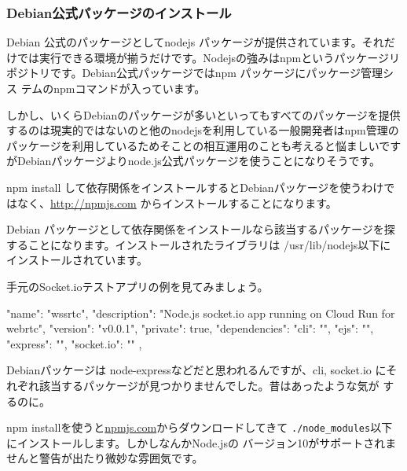 \documentclass[mingoth,a4paper]{jsarticle}
\begin{document}
\subsubsection{Debian公式パッケージのインストール}


Debian 公式のパッケージとしてnodejs パッケージが提供されています。それだ
けでは実行できる環境が揃うだけです。Nodejsの強みはnpmというパッケージリ
ポジトリです。Debian公式パッケージではnpm パッケージにパッケージ管理シス
テムのnpmコマンドが入っています。


しかし、いくらDebianのパッケージが多いといってもすべてのパッケージを提供
するのは現実的ではないのと他のnodejsを利用している一般開発者はnpm管理の
パッケージを利用しているためそことの相互運用のことも考えると悩ましいです
がDebianパッケージよりnode.js公式パッケージを使うことになりそうです。

npm install して依存関係をインストールするとDebianパッケージを使うわけで
はなく、\url{http://npmjs.com} からインストールすることになります。

Debian パッケージとして依存関係をインストールなら該当するパッケージを探
することになります。インストールされたライブラリは /usr/lib/nodejs以下に
インストールされています。

手元のSocket.ioテストアプリの例を見てみましょう。

\begin{commandline}
{
  "name": "wssrtc",
  "description": "Node.js socket.io app running on Cloud Run for webrtc",
  "version": "v0.0.1",
  "private": true,
  "dependencies": {
    "cli": "",
    "ejs": "",
    "express": "",
    "socket.io": ""
  },
}
\end{commandline}

Debianパッケージは node-expressなどだと思われるんですが、cli, socket.io
にそれぞれ該当するパッケージが見つかりませんでした。昔はあったような気が
するのに。

npm installを使うと\url{npmjs.com}からダウンロードしてきて
\texttt{./node\_modules}以下にインストールします。しかしなんかNode.jsの
バージョン10がサポートされませんと警告が出たり微妙な雰囲気です。
\end{document}
